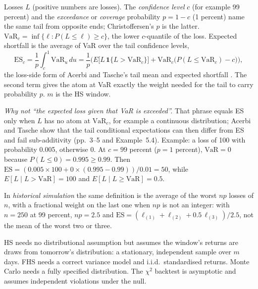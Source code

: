 \begin{qfmethod}
 Losses $L$ (positive numbers are losses). The \emph{confidence level} $c$ (for example 99 percent) and the \emph{exceedance} or \emph{coverage} probability $p=1-c$ (1 percent) name the same tail from opposite ends; Christoffersen's $p$ is the latter. $\mathrm{VaR}_c=\inf\{\ell:P(L\le\ell)\ge c\}$, the lower $c$-quantile of the loss. Expected shortfall is the average of VaR over the tail confidence levels,
\[ \mathrm{ES}_c=\frac1{p}\int_c^1\mathrm{VaR}_u\,du=\frac1{p}\Big(E\big[L\,\mathbf 1\{L>\mathrm{VaR}_c\}\big]+\mathrm{VaR}_c\big(P(L\le\mathrm{VaR}_c)-c\big)\Big), \]
the loss-side form of Acerbi and Tasche's tail mean and expected shortfall \citep[Definition~2.6, p.~5; Proposition~3.2, p.~6; eq.~(3.3), p.~7, stated for a profit $X$ and tail level $\alpha=p$]{acerbi-tasche-2001}. The second term gives the atom at VaR exactly the weight needed for the tail to carry probability $p$. $m$ is the HS window.

\emph{Why not ``the expected loss given that VaR is exceeded''.} That phrase equals ES only when $L$ has no atom at $\mathrm{VaR}_c$, for example a continuous distribution; Acerbi and Tasche show that the tail conditional expectations can then differ from ES and fail sub-additivity (pp.~3--5 and Example~5.4). Example: a loss of 100 with probability 0.005, otherwise 0. At $c=99$ percent ($p=1$ percent), $\mathrm{VaR}=0$ because $P(L\le0)=0.995\ge0.99$. Then $\mathrm{ES}=(0.005\times100+0\times(0.995-0.99))/0.01=50$, while $E[L\mid L>\mathrm{VaR}]=100$ and $E[L\mid L\ge\mathrm{VaR}]=0.5$.

In \emph{historical simulation} the same definition is the average of the worst $np$ losses of $n$, with a fractional weight on the last one when $np$ is not an integer: with $n=250$ at 99 percent, $np=2.5$ and $\mathrm{ES}=(\ell_{(1)}+\ell_{(2)}+0.5\,\ell_{(3)})/2.5$, not the mean of the worst two or three.

 HS needs no distributional assumption but assumes the window's returns are draws from tomorrow's distribution: a stationary, independent sample over $m$ days. FHS needs a correct variance model and i.i.d.\ standardised returns. Monte Carlo needs a fully specified distribution. The $\chi^2$ backtest is asymptotic and assumes independent violations under the null.


\end{qfmethod}
